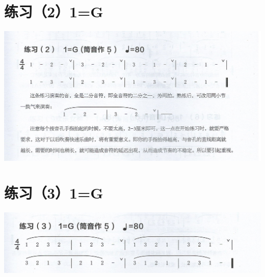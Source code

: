 \documentclass[cn,pad,chinese,chinesefont=nofont]{elegantbook}
\begin{document}
\section{练习（2）1=G}
\includegraphics[width=\textwidth]{dongxiao/Scan 1-2.jpeg}
\section{练习（3）1=G}
\includegraphics[width=\textwidth]{dongxiao/Scan 1-3.jpeg}
\end{document}
